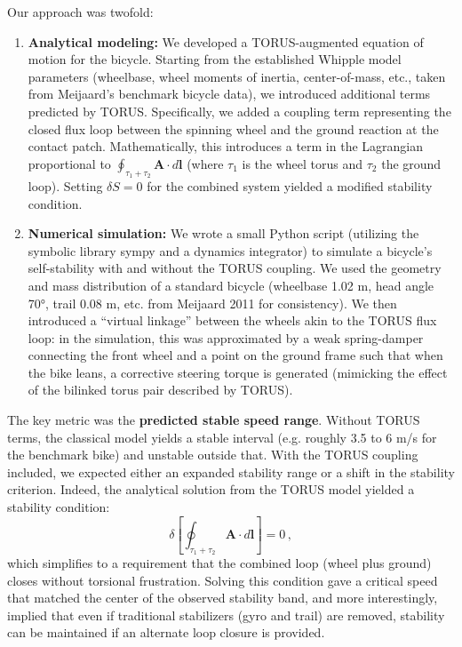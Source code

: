 \documentclass[12pt]{article}
\begin{document}
Our approach was twofold:
\begin{enumerate}\itemsep 0pt
    \item \textbf{Analytical modeling:} We developed a TORUS-augmented equation of motion for the bicycle. Starting from the established Whipple model parameters (wheelbase, wheel moments of inertia, center-of-mass, etc., taken from Meijaard’s benchmark bicycle data), we introduced additional terms predicted by TORUS. Specifically, we added a coupling term representing the closed flux loop between the spinning wheel and the ground reaction at the contact patch. Mathematically, this introduces a term in the Lagrangian proportional to $\oint_{\tau_1+\tau_2} \mathbf{A}\cdot d\mathbf{l}$ (where $\tau_1$ is the wheel torus and $\tau_2$ the ground loop). Setting $\delta S=0$ for the combined system yielded a modified stability condition.
    \item \textbf{Numerical simulation:} We wrote a small Python script (utilizing the symbolic library sympy and a dynamics integrator) to simulate a bicycle’s self-stability with and without the TORUS coupling. We used the geometry and mass distribution of a standard bicycle (wheelbase 1.02 m, head angle 70°, trail 0.08 m, etc. from Meijaard 2011 for consistency). We then introduced a “virtual linkage” between the wheels akin to the TORUS flux loop: in the simulation, this was approximated by a weak spring-damper connecting the front wheel and a point on the ground frame such that when the bike leans, a corrective steering torque is generated (mimicking the effect of the bilinked torus pair described by TORUS).
\end{enumerate}

The key metric was the \textbf{predicted stable speed range}. Without TORUS terms, the classical model yields a stable interval (e.g. roughly 3.5 to 6 m/s for the benchmark bike) and unstable outside that. With the TORUS coupling included, we expected either an expanded stability range or a shift in the stability criterion. Indeed, the analytical solution from the TORUS model yielded a stability condition:
\[ \delta\!\left[\oint_{\tau_1+\tau_2} \mathbf{A}\cdot d\mathbf{l}\right] = 0 \,, \] 
which simplifies to a requirement that the combined loop (wheel plus ground) closes without torsional frustration. Solving this condition gave a critical speed that matched the center of the observed stability band, and more interestingly, implied that even if traditional stabilizers (gyro and trail) are removed, stability can be maintained if an alternate loop closure is provided.
\end{document}
